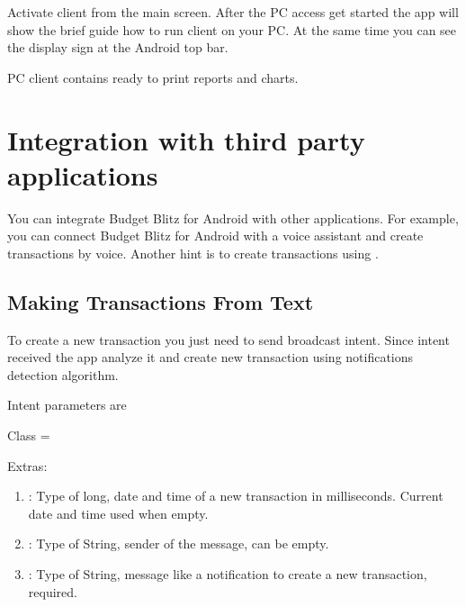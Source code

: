 \documentclass[a4paper,10pt,english]{sphinxmanual}
\begin{document}
\noindent{}

\noindent{}

\noindent{}

Activate client from the main screen. After the PC access get started the app will show
the brief guide how to run client on your PC. At the same time you can see the display sign
at the Android top bar.

PC client contains ready to print reports and charts.


\chapter{Integration with third party applications}
\label{\detokenize{api:integration-with-third-party-applications}}\label{\detokenize{api:chapter-api}}\label{\detokenize{api::doc}}
You can integrate Budget Blitz for Android with other applications. For example, you can connect Budget Blitz for Android
with a voice assistant and create transactions by voice. Another hint is to create
transactions using .


\section{Making Transactions From Text}
\label{\detokenize{api:making-transactions-from-text}}
To create a new transaction you just need to send broadcast intent. Since intent received the app analyze it
and create new transaction using notifications detection algorithm.

Intent parameters are

Class = 

Extras:
\begin{enumerate}
\def\theenumi{\arabic{enumi}}
\def\labelenumi{\theenumi .}
\makeatletter\def\p@enumii{\p@enumi \theenumi .}\makeatother
\item {} 
: Type of long, date and time of a new transaction in milliseconds. Current date and time used when empty.

\item {} 
: Type of String, sender of the message, can be empty.

\item {} 
: Type of String, message like a notification to create a new transaction, required.

\end{enumerate}
\end{document}
